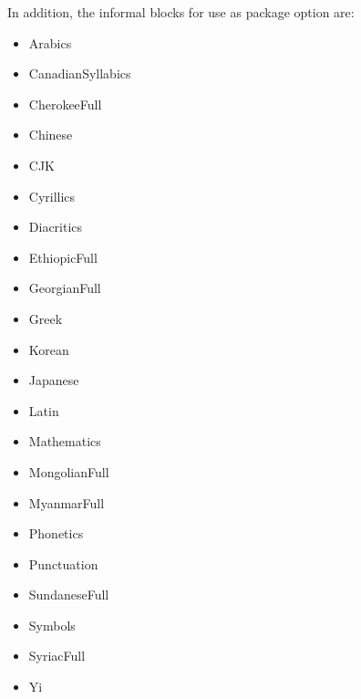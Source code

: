 \documentclass{article}
\newenvironment{itemlist}{%
  \begin{itemize}
	\setlength{\itemsep}{0pt}
	\setlength{\parsep}{0pt}
	\setlength{\topsep}{0pt}
	\setlength{\partopsep}{0pt}
	\setlength{\parskip}{0pt}
	\setlength{\labelsep}{5pt}}%
{
  \end{itemize}}
\begin{document}
		In addition, the informal blocks for use as package option are:

		\begin{multicols*}{2}
			\begin{itemlist}
				\item Arabics
				\item CanadianSyllabics
				\item CherokeeFull
				\item Chinese
				\item CJK
				\item Cyrillics
				\item Diacritics
				\item EthiopicFull
				\item GeorgianFull
				\item Greek
				\item Korean
				\item Japanese
				\item Latin
				\item Mathematics
				\item MongolianFull
				\item MyanmarFull
				\item Phonetics
				\item Punctuation
				\item SundaneseFull
				\item Symbols
				\item SyriacFull
				\item Yi
			\end{itemlist}
		\end{multicols*}
\end{document}
